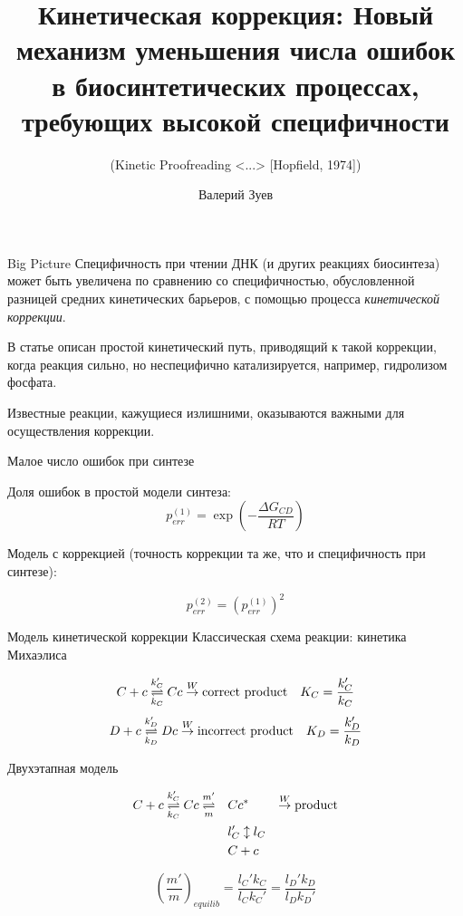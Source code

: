 \documentclass{beamer}
\title{Кинетическая коррекция: Новый механизм уменьшения числа ошибок в биосинтетических процессах, требующих высокой специфичности}
\subtitle{(Kinetic Proofreading <...> [Hopfield, 1974])}
\author{Валерий Зуев}
\begin{document}
\begin{frame}[plain]
    \maketitle
\end{frame}
\begin{frame}{Big Picture}
Специфичность при чтении ДНК (и других реакциях биосинтеза) может быть увеличена по сравнению со специфичностью, обусловленной разницей средних кинетических барьеров, с помощью процесса \emph{кинетической коррекции}.

В статье описан простой кинетический путь, приводящий к такой коррекции, когда реакция сильно, но неспецифично катализируется, например, гидролизом фосфата.

Известные реакции, кажущиеся излишними, оказываются важными для осуществления коррекции.

\end{frame}

\begin{frame}{Малое число ошибок при синтезе}

Доля ошибок в простой модели синтеза:
\[ p_{err}^{(1)} = \exp \left( - \frac{\Delta G_{CD}}{RT} \right) \]

Модель с коррекцией (точность коррекции та же, что и специфичность при синтезе):

\[ p_{err}^{(2)} = \left(p_{err}^{(1)}\right)^2 \]


\end{frame}

\begin{frame}{Модель кинетической коррекции}
Классическая схема реакции: кинетика Михаэлиса

\[ C + c \overunderset{k'_C}{k_C}{\rightleftharpoons} Cc \overset{W}\to \text{correct product} \quad K_C = \frac{k'_C}{k_C} \]
\[ D + c \overunderset{k'_D}{k_D}{\rightleftharpoons} Dc \overset{W}\to \text{incorrect product} \quad K_D = \frac{k'_D}{k_D} \]

\end{frame}

\begin{frame}{Двухэтапная модель}

\begin{align*}
C + c \overunderset{k'_C}{k_C}{\rightleftharpoons} Cc \overunderset{m'}{m}{\rightleftharpoons} \quad & Cc^* & \overset{W}\to \text{product} \\
& l'_C \updownarrow l_C & \\
& C+c &
\end{align*}

\[ \left( \frac{m'}{m} \right)_{equilib} =  \frac{l_C' k_C}{ l_C k_C' }  = \frac{l_D' k_D}{l_D k_D'} \]


\end{frame}
\end{document}
